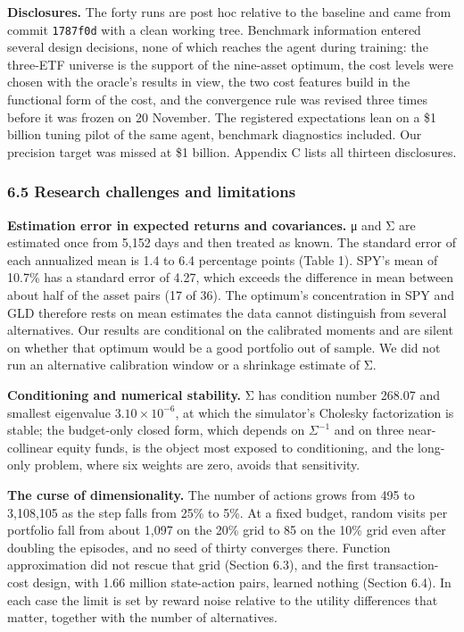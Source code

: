 \documentclass[
  11pt]{article}
\begin{document}
\textbf{Disclosures.} The forty runs are post hoc relative to the
baseline and came from commit \texttt{1787f0d} with a clean working
tree. Benchmark information entered several design decisions, none of
which reaches the agent during training: the three-ETF universe is the
support of the nine-asset optimum, the cost levels were chosen with the
oracle's results in view, the two cost features build in the functional
form of the cost, and the convergence rule was revised three times
before it was frozen on 20 November. The registered expectations lean on
a \$1 billion tuning pilot of the same agent, benchmark diagnostics
included. Our precision target was missed at \$1 billion. Appendix C
lists all thirteen disclosures.

\subsubsection{6.5 Research challenges and
limitations}\label{research-challenges-and-limitations}

\textbf{Estimation error in expected returns and covariances.} μ and Σ
are estimated once from 5,152 days and then treated as known. The
standard error of each annualized mean is 1.4 to 6.4 percentage points
(Table 1). SPY's mean of 10.7\% has a standard error of 4.27, which
exceeds the difference in mean between about half of the asset pairs (17
of 36). The optimum's concentration in SPY and GLD therefore rests on
mean estimates the data cannot distinguish from several alternatives.
Our results are conditional on the calibrated moments and are silent on
whether that optimum would be a good portfolio out of sample. We did not
run an alternative calibration window or a shrinkage estimate of Σ.

\textbf{Conditioning and numerical stability.} Σ has condition number
268.07 and smallest eigenvalue \(3.10 \times 10^{-6}\), at which the
simulator's Cholesky factorization is stable; the budget-only closed
form, which depends on \(\Sigma^{-1}\) and on three near-collinear
equity funds, is the object most exposed to conditioning, and the
long-only problem, where six weights are zero, avoids that sensitivity.

\textbf{The curse of dimensionality.} The number of actions grows from
495 to 3,108,105 as the step falls from 25\% to 5\%. At a fixed budget,
random visits per portfolio fall from about 1,097 on the 20\% grid to 85
on the 10\% grid even after doubling the episodes, and no seed of thirty
converges there. Function approximation did not rescue that grid
(Section 6.3), and the first transaction-cost design, with 1.66 million
state-action pairs, learned nothing (Section 6.4). In each case the
limit is set by reward noise relative to the utility differences that
matter, together with the number of alternatives.
\end{document}
